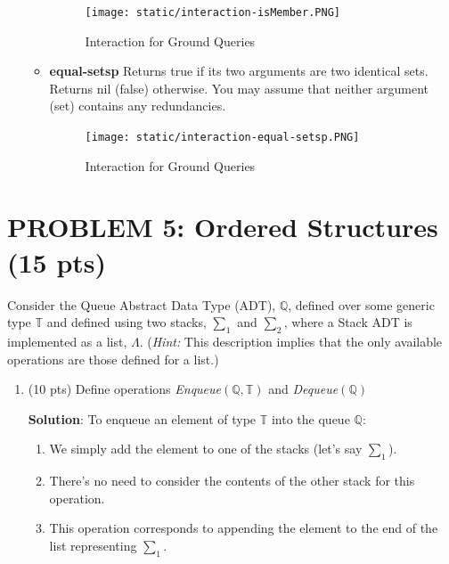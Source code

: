 \documentclass[12pt]{article}
\begin{document}
\begin{spacing}{1.5}
\begin{enumerate}
\begin{itemize}
                    

                \begin{figure}[htp]
            		\centering
            		\texttt{[image: static/interaction-isMember.PNG]}
            		\caption{Interaction for Ground Queries}
            		\label{fig:figure}
            	\end{figure}

		      	\item \textbf{equal-setsp} Returns true if its two arguments are two identical sets. Returns nil (false) otherwise. You may assume that neither argument (set) contains any redundancies.

                    

                \begin{figure}[htp]
            		\centering
            		\texttt{[image: static/interaction-equal-setsp.PNG]}
            		\caption{Interaction for Ground Queries}
            		\label{fig:figure}
            	\end{figure}

		      \end{itemize}
		      		      		      		                  
	\end{enumerate}
				        
	\newpage
	\section*{PROBLEM 5: Ordered Structures (15 pts)}
	Consider the Queue Abstract Data Type (ADT), $\mathbb{Q}$, defined over some generic type $\mathbb{T}$ and defined using two stacks, $\sum_1$ and $\sum_2$, where a Stack ADT is implemented as a list, $\Lambda$. (\textit{Hint: } This description implies that the only available operations are those defined for a list.) 
				
	\begin{enumerate}
		\item (10 pts) Define operations \textit{Enqueue}$(\mathbb{Q},\mathbb{T})$ and \textit{Dequeue}$(\mathbb{Q})$
		      		      		      		      
		      \textbf{Solution}: To enqueue an element of type $\mathbb{T}$ into the queue $\mathbb{Q}$:
		      		      		      		      
		      \begin{enumerate}
		      	\item We simply add the element to one of the stacks (let's say $\sum_1$).
		      	\item There's no need to consider the contents of the other stack for this operation.
		      	\item This operation corresponds to appending the element to the end of the list representing $\sum_1$.
		      \end{enumerate} 
		      		      		      		      

\end{enumerate}
\end{spacing}
\end{document}
